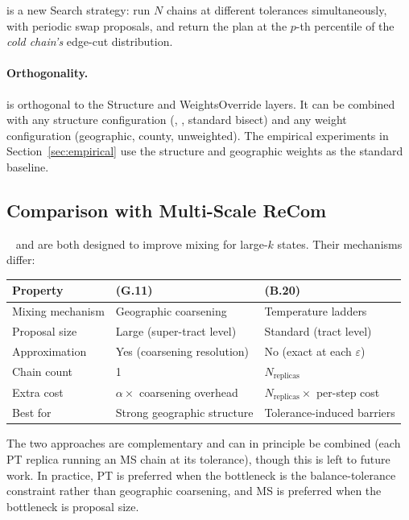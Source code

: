\pt{} is a new Search strategy: run $N$ chains at different tolerances
simultaneously, with periodic swap proposals, and return the plan at the
$p$-th percentile of the \emph{cold chain's} edge-cut distribution.

\paragraph{Orthogonality.}
\pt{} is orthogonal to the Structure and WeightsOverride layers.
It can be combined with any structure configuration (\geosec{},
\ar{}, standard bisect) and any weight configuration (geographic,
county, unweighted).
The empirical experiments in Section~\ref{sec:empirical} use the
\geosec{} structure and geographic weights as the standard baseline.

\subsection{Comparison with Multi-Scale ReCom}

\ms{}~\citep{dellaLibera2026multiscale} and \pt{} are both designed to improve
mixing for large-$k$ states.
Their mechanisms differ:

\begin{center}
\renewcommand{\arraystretch}{1.25}
\begin{tabular}{@{}lll@{}}
\toprule
Property & \ms{} (G.11) & \pt{} (B.20) \\
\midrule
Mixing mechanism & Geographic coarsening & Temperature ladders \\
Proposal size & Large (super-tract level) & Standard (tract level) \\
Approximation & Yes (coarsening resolution) & No (exact \fr{} at each $\varepsilon$) \\
Chain count & 1 & $N_{\mathrm{replicas}}$ \\
Extra cost & $\alpha \times$ coarsening overhead & $N_{\mathrm{replicas}} \times$ per-step cost \\
Best for & Strong geographic structure & Tolerance-induced barriers \\
\bottomrule
\end{tabular}
\end{center}

The two approaches are complementary and can in principle be combined (each PT
replica running an MS chain at its tolerance), though this is left to future
work.
In practice, PT is preferred when the bottleneck is the balance-tolerance
constraint rather than geographic coarsening, and MS is preferred when the
bottleneck is proposal size.
